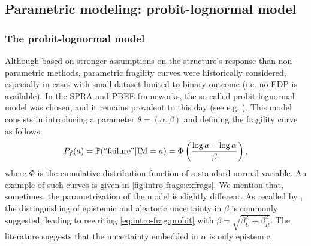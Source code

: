 



\subsection{Parametric modeling: probit-lognormal model}\label{sec:intro-frags:subsec-parametric}

\subsubsection{The probit-lognormal model}


Although based on stronger assumptions on the structure's response than non-parametric methods, parametric fragility curves were historically considered, especially in cases with small dataset limited to binary outcome (i.e. no EDP is available).
In the SPRA and PBEE frameworks, the so-called probit-lognormal model was chosen, and it remains prevalent to this day (see e.g. \cite{shinozuka_statistical_2000,straub_improved_2008,zentner_numerical_2010,wang_influence_2020,mandal_seismic_2016,zhao_seismic_2020,ellingwood_earthquake_2001,kim_development_2004,mai_seismic_2017,trevlopoulos_parametric_2019,katayama_bayesian-estimation-based_2021,lee_efficient_2023}).
This model consists in introducing a parameter $\theta=(\alpha,\beta)$ and defining the fragility curve as follows
    \begin{equation}\label{eq:intro-frag:probit}
        P_f(a) = \mathbb{P}(\text{``failure''}|\text{IM}=a) = \Phi\left( \frac{\log a-\log\alpha}{\beta} \right),
    \end{equation}
where $\Phi$ is the cumulative distribution function of a standard normal variable. An example of such curves is given in \cref{fig:intro-frags:exfrags}.
We mention that, sometimes, the parametrization of the model is slightly different. As recalled by \cite{zentner_fragility_2017}, the distinguishing of epistemic and aleatoric uncertainty in $\beta$ is commonly suggested, leading to rewriting \cref{eq:intro-frag:probit} with $\beta=\sqrt{\beta^2_U+\beta^2_R}$. 
The literature suggests that the uncertainty embedded in $\alpha$ is only epistemic.

